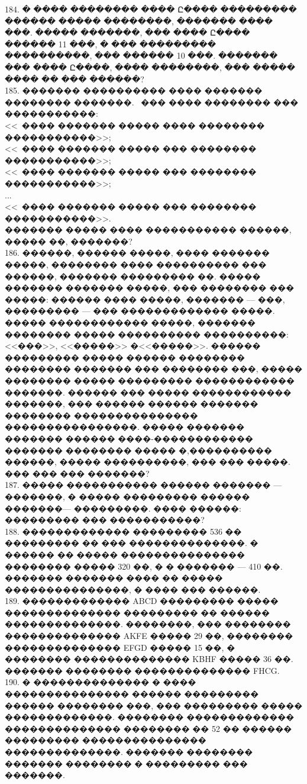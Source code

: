 \documentclass[12pt]{article}
\begin{document}
184. � ���� �������� ���� Ը���� ��������� ������ ����� ��������, ������� ���� ���. ����� �������, ��� ���� Ը���� ������ 11 ���, � ��� ��������� ����������, ��� ������ 10 ���. ������� ��� ���� Ը����, ���� ��������, ��� ����� ���� �� ��� ������?\\
185. ������� ���������� ���� ������� �������� �������.  ��� ���� �������� ��� �����������:\\
<< ���� ������� ����� ���� �������� �����������>>;\\
<< ���� ������� ����� ��� �������� �����������>>;\\
<< ���� ������� ����� ��� �������� �����������>>;\\
...\\
<< ���� ������� ����� ��� �������� �����������>>.\\
������� ����� ���� ����������� ������, ����� ��, �������?\\
186. ������, ������ �����, ���� ������� �����, �������� ���� ���������� ��� ������, ������� ��������� ��. ����� ������� ������� �����, ��� �������� ��� �����: ������ ���� �����, ������� --- ���, ��������� --- ��� ������������� �����. ����� ������������ �����, ������� �������� ����� ���������� ����������: <<���>>, <<�����>> �<<�����>>. ������ ��������� ����� ������ �������� �������� ������� ��� �������� ���, ����� �������� ����� ��������� ������������ �������. ������ ��� ����� ������������ �������, ��� ������ ������ ������� �������� ��������������� ����������������. ����� ������� ������� ������ ����-������������ ������� �������� ����� �,���������� ������, ����� ����������, ��� ��� �����. ��� ��� ��� �������?\\
187. ����� ����������� ������ ������� --- �������, � ����� ��������� ������ �������--- ���������. ���� ������: ��������� ��� �����������?\\
188. ������������� ��������� 536 �� ��������� �� ��� ��������������. � ������ �� ����� ��������������� �������� ����� 320 ��, � � ������� --- 410 ��. ������� ������� ���� �� ����� ���������������, � ���� ��� ������.\\
189. ������������� ABCD ��������� ����� �������������� ��������� �� ������ ��������������. ��������, ��� �������� �������������� AKFE ����� 29 ��, �������� �������������� EFGD ����� 15 ��,  � �������� �������������� KBHF ����� 36 ��. ������� �������� �������������� FHCG.\\
190.  � �������������� � ���� ��������������� ������ ��������� ������ �������� ���, ��� ��������� ����� �������������. �������� ������������� �������������� �������� �� 52 �� ������ ��������� ��������������� ��������������. ������� �������� ������� �������� � ��������� ��� �������.\\
\end{document}
